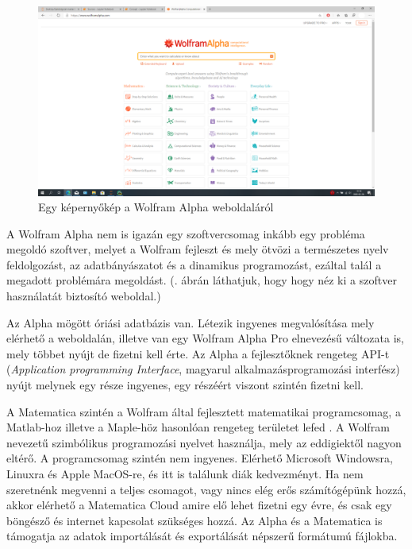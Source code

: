 
\begin{figure}
\centering
\includegraphics[width=\textwidth]{img/alpha_screen.png}
\caption{Egy képernyőkép a Wolfram Alpha weboldaláról}
\label{fig:wolfram-alpha}
\end{figure}

A Wolfram Alpha nem is igazán egy szoftvercsomag inkább egy probléma
megoldó szoftver, melyet a Wolfram fejleszt és mely ötvözi a természetes
nyelv feldolgozást, az adatbányászatot és a dinamikus programozást,
ezáltal talál a megadott problémára megoldást.
(. ábrán láthatjuk, hogy hogy néz ki a szoftver használatát biztosító weboldal.)

Az Alpha mögött óriási
adatbázis van. Létezik ingyenes megvalósítása mely elérhető a
weboldalán, illetve van egy Wolfram Alpha Pro elnevezésű változata is,
mely többet nyújt de fizetni kell érte. Az Alpha a fejlesztőknek
rengeteg API-t (\emph{Application programming Interface}, magyarul
alkalmazásprogramozási interfész) nyújt melynek egy része ingyenes, egy
részéért viszont szintén fizetni kell.

A Matematica szintén a Wolfram által fejlesztett matematikai
programcsomag, a Matlab-hoz illetve a Maple-höz hasonlóan rengeteg
területet lefed
\cite{wolfram}.
A Wolfram nevezetű szimbólikus programozási nyelvet
használja, mely az eddigiektől nagyon eltérő. A programcsomag szintén
nem ingyenes. Elérhető Microsoft Windowsra, Linuxra és Apple MacOS-re,
és itt is találunk diák kedvezményt. Ha nem szeretnénk megvenni a teljes
csomagot, vagy nincs elég erős számítógépünk hozzá, akkor elérhető a
Matematica Cloud amire elő lehet fizetni egy évre, és csak egy böngésző
és internet kapcsolat szükséges hozzá. Az Alpha és a Matematica is
támogatja az adatok importálását és exportálását népszerű formátumú
fájlokba.

